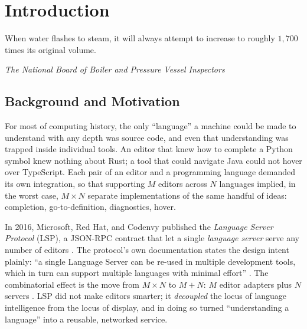 \chapter{Introduction}
\label{ch:introduction}

\epigraph{When water flashes to steam, it will always attempt to increase to
roughly $1{,}700$ times its original volume.}{\textit{The National Board of
Boiler and Pressure Vessel Inspectors} \citep{nationalboard-steam}}

\section{Background and Motivation}
\label{sec:motivation}

For most of computing history, the only ``language'' a machine could be made to
understand with any depth was source code, and even that understanding was
trapped inside individual tools. An editor that knew how to complete a Python
symbol knew nothing about Rust; a tool that could navigate Java could not hover
over TypeScript. Each pair of an editor and a programming language demanded its
own integration, so that supporting $M$ editors across $N$ languages implied, in
the worst case, $M \times N$ separate implementations of the same handful of
ideas: completion, go-to-definition, diagnostics, hover.

In 2016, Microsoft, Red Hat, and Codenvy published the \emph{Language Server
Protocol} (LSP), a JSON-RPC contract that let a single \emph{language server}
serve any number of editors \citep{lsp-redhat-2016,lsp-official}. The protocol's
own documentation states the design intent plainly: ``a single Language Server
can be re-used in multiple development tools, which in turn can support multiple
languages with minimal effort'' \citep{lsp-official}. The combinatorial effect
is the move from $M \times N$ to $M + N$: $M$ editor adapters plus $N$ servers
\citep{lsp-mxn-fcc}. LSP did not make editors smarter; it \emph{decoupled} the
locus of language intelligence from the locus of display, and in doing so turned
``understanding a language'' into a reusable, networked service.

